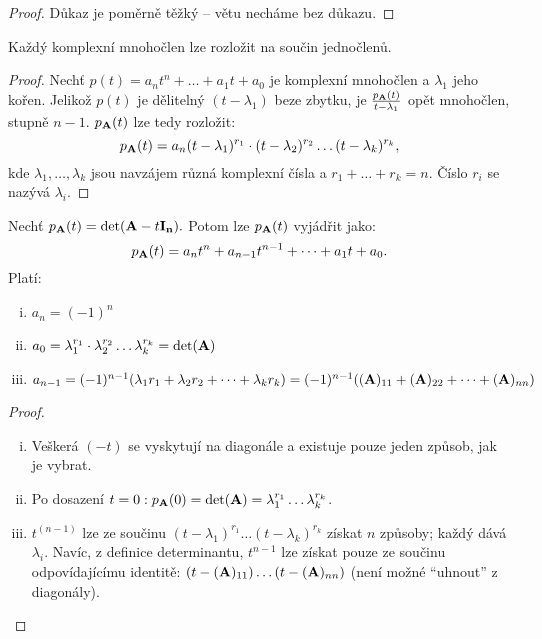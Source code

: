 \begin{proof}
    Důkaz je poměrně těžký -- větu necháme bez důkazu.
\end{proof}

\begin{corollary}
    Každý komplexní mnohočlen lze rozložit na součin jednočlenů.
\end{corollary}

\begin{proof}
    Nechť $p(t) = a_nt^n + \dots + a_1t + a_0$ je komplexní mnohočlen
    a $\lambda_1$ jeho kořen. Jelikož $p(t)$ je dělitelný $(t-\lambda_1)$ 
    beze zbytku, je $\frac{p_{\mathbf{A}}(t)}{t-\lambda_1}$ opět
    mnohočlen, stupně $n-1$. $p_{\mathbf{A}}(t)$ lze tedy rozložit: 
    $$p_{\mathbf{A}}(t) = a_n(t-\lambda_1)^{r_1} \cdot
    (t-\lambda_2)^{r_2} \dots  (t - \lambda_k)^{r_k},$$ kde $\lambda_1,
    \dots, \lambda_k$ jsou navzájem různá komplexní čísla a $r_1 + \dots + r_k = n$.
    Číslo $r_i$ se nazývá  $\lambda_i$.
\end{proof}

\begin{observation}
    Nechť $p_{\mathbf{A}}(t) = \det(\mathbf{A} -t\mathbf{I_{n}}).$ Potom lze $p_{\mathbf{A}}(t)$ vyjádřit jako:
    $$p_{\mathbf{A}}(t) = a_nt^n + a_{n-1}t^{n-1} + \dots + a_1t + a_0.$$
    Platí:
    \begin{enumerate}[i.]
        \item $a_n = (-1)^n$
        \item $a_0 = \lambda_1^{r_1} \cdot \lambda_2^{r_2} \dots \lambda_k^{r_k}
            = \det(\mathbf{A})$
        \item $a_{n-1} = (-1)^{n-1}(\lambda_1r_1 + \lambda_2r_2 + \dots + 
            \lambda_kr_k) = (-1)^{n-1}((\mathbf{A})_{11} + (\mathbf{A})_{22} + \dots +
            (\mathbf{A})_{nn})$
    \end{enumerate}
\end{observation}

\begin{proof}
    \leavevmode
    \begin{enumerate}[i.]
        \item Veškerá $(-t)$ se vyskytují na diagonále a existuje pouze jeden
            způsob, jak je vybrat.
        \item Po dosazení $t=0: p_{\mathbf{A}}(0) = \det(\mathbf{A}) = \lambda_1^{r_1}\dots
            \lambda_k^{r_k}$.
        \item $t^{(n-1)}$ lze ze součinu $(t - \lambda_1)^{r_1}\dots(t - 
            \lambda_k)^{r_k}$ získat $n$ způsoby; každý dává $\lambda_i$.
            Navíc, z definice determinantu, $t^{n-1}$ lze získat pouze
            ze součinu odpovídajícímu identitě: $(t - (\mathbf{A})_{11})\dots
            (t-(\mathbf{A})_{nn})$ (není možné ``uhnout'' z diagonály).
    \end{enumerate}
\end{proof}

